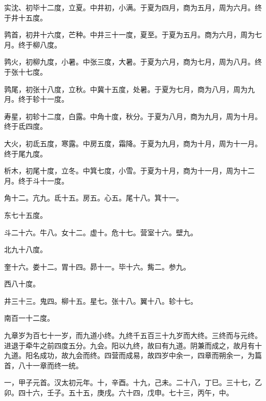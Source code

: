\documentclass[12pt,UTF8]{ctexbook}
\begin{document}
实沈、初毕十二度，立夏。中井初，小满。于夏为四月，商为五月，周为六月。终于井十五度。



鹑首，初井十六度，芒种。中井三十一度，夏至。于夏为五月。商为六月，周为七月。终于柳八度。



鹑火，初柳九度，小暑。中张三度，大暑。于夏为六月，商为七月，周为八月。终于张十七度。



鹑尾，初张十八度，立秋。中冀十五度，处暑。于夏为七月，商为八月，周为九月。终于轸十一度。



寿星，初轸十二度，白露。中角十度，秋分。于夏为八月，商为九月，周为十月。终于氐四度。



大火，初氐五度，寒露。中房五度，霜降。于夏为九月，商为十月，周为十一月。终于尾九度。



析木，初尾十度，立冬。中箕七度，小雪。于夏为十月，商为十一月，周为十二月。终于斗十一度。



角十二。亢九。氐十五。房五。心五。尾十八。箕十一。



东七十五度。



斗二十六。牛八。女十二。虚十。危十七。营室十六。壁九。



北九十八度。



奎十六。娄十二。胃十四。昴十一。毕十六。觜二。参九。



西八十度。



井三十三。鬼四。柳十五。星七。张十八。翼十八。轸十七。



南百一十二度。



九章岁为百七十一岁，而九道小终。九终千五百三十九岁而大终。三终而与元终。进退于牵牛之前四度五分。九会。阳以九终，故曰有九道。阴兼而成之，故月有十九道。阳名成功，故九会而终。四营而成易，故四岁中余一，四章而朔余一，为篇首，八十一章而终一统。



一，甲子元首。汉太初元年。十，辛酉。十九，己未。二十八，丁巳。三十七，乙卯。四十六，壬子。五十五，庚戌。六十四，戊申。七十三，丙午，中。
\end{document}
